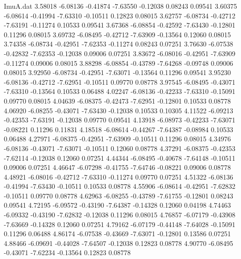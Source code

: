 \begin{filecontents}{ImuA.dat}
   3.58018   -6.08136   -0.41874   -7.63550   -0.12038    0.08243    0.09541
   3.60375   -6.08614   -0.41994   -7.63310   -0.10511    0.12823    0.08015
   3.62757   -6.08734   -0.42712   -7.63191   -0.11274    0.10533    0.09541
   3.67368   -6.08854   -0.42592   -7.63430   -0.12801    0.11296    0.08015
   3.69732   -6.08495   -0.42712   -7.63909   -0.13564    0.12060    0.08015
   3.74358   -6.08734   -0.42951   -7.62353   -0.11274    0.08243    0.07251
   3.76630   -6.07538   -0.42832   -7.62353   -0.12038    0.09006    0.07251
   3.83672   -6.08016   -0.42951   -7.63909   -0.11274    0.09006    0.08015
   3.88298   -6.08854   -0.43789   -7.64268   -0.09748    0.09006    0.08015
   3.92950   -6.08734   -0.42951   -7.63071   -0.13564    0.11296    0.09541
   3.95230   -6.08136   -0.42712   -7.62951   -0.10511    0.09770    0.08778
   3.97545   -6.08495   -0.43071   -7.63310   -0.13564    0.10533    0.06488
   4.02247   -6.08136   -0.42233   -7.63310   -0.15091    0.09770    0.08015
   4.04639   -6.08375   -0.42473   -7.62951   -0.12801    0.10533    0.08778
   4.06920   -6.08255   -0.43071   -7.63430   -0.12038    0.10533    0.10305
   4.11522   -6.09213   -0.42353   -7.63191   -0.12038    0.09770    0.09541
   4.13918   -6.08973   -0.42233   -7.63071   -0.08221    0.11296    0.11831
   4.18518   -6.08614   -0.44267   -7.64387   -0.08984    0.10533    0.06488
   4.27971   -6.08375   -0.42951   -7.63909   -0.10511    0.11296    0.08015
   4.34976   -6.08136   -0.43071   -7.63071   -0.10511    0.12060    0.08778
   4.37291   -6.08375   -0.42353   -7.62114   -0.12038    0.12060    0.07251
   4.44344   -6.08495   -0.40678   -7.64148   -0.10511    0.09006    0.07251
   4.46647   -6.07298   -0.41755   -7.64746   -0.08221    0.09006    0.08778
   4.48921   -6.08016   -0.42712   -7.63310   -0.11274    0.09770    0.07251
   4.51322   -6.08136   -0.41994   -7.63430   -0.10511    0.10533    0.08778
   4.55906   -6.08614   -0.42951   -7.62832   -0.10511    0.09770    0.08778
   4.62963   -6.08255   -0.43789   -7.61755   -0.12801    0.08243    0.09541
   4.72195   -6.09572   -0.43190   -7.64387   -0.14328    0.12060    0.04198
   4.74463   -6.09332   -0.43190   -7.62832   -0.12038    0.11296    0.08015
   4.76857   -6.07179   -0.43908   -7.63669   -0.14328    0.12060    0.07251
   4.79162   -6.07179   -0.44148   -7.64028   -0.15091    0.11296    0.06488
   4.86174   -6.07538   -0.43669   -7.63071   -0.12801    0.13586    0.07251
   4.88466   -6.09691   -0.44028   -7.64507   -0.12038    0.12823    0.08778
   4.90770   -6.08495   -0.43071   -7.62234   -0.13564    0.12823    0.08778

\end{filecontents}
